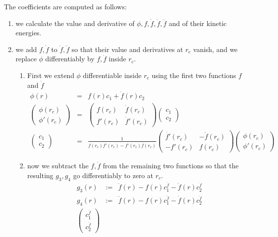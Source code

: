 \documentclass[11pt,a4paper]{report}
\begin{document}
The coefficients are computed as follows:
\begin{enumerate}
\item we calculate the value and derivative of
  $\phi,f,\dot{f},\ddot{f},\dddot{f}$ and of their kinetic energies.
\item we add $f,\dot{f}$ to $\ddot{f},\dddot{f}$ so that their value
  and derivatives at $r_c$ vanish, and we replace $\phi$
  differentiably by $f,\dot{f}$ inside $r_c$.
\begin{enumerate}
\item First we extend $\phi$ differentiable inside $r_c$ using the
  first two functions $f$ and $\dot{f}$
\begin{eqnarray}
\phi(r)&=&f(r)c_1 + \dot{f}(r)c_2
\\
\left(\begin{array}{c}\phi(r_c)\\\phi'(r_c)\end{array}\right)
&=&
\left(\begin{array}{cc}f(r_c)&\dot{f}(r_c)\\f'(r_c)&\dot{f}'(r_c)\end{array}\right)
\left(\begin{array}{c}c_1\\c_2\end{array}\right)
\nonumber\\
\left(\begin{array}{c}c_1\\c_2\end{array}\right)
&=&
\frac{1}{f(r_c)\dot{f'}(r_c)-f'(r_c)\dot{f}(r_c)}
\left(\begin{array}{cc}\dot{f'}(r_c)&-\dot{f}(r_c)\\-f'(r_c)&f(r_c)\end{array}\right)
\left(\begin{array}{c}\phi(r_c)\\\phi'(r_c)\end{array}\right)
\end{eqnarray}
%
\item now we subtract the $f,\dot{f}$ from the remaining two functions
  so that the resulting $g_3,g_4$ go differentiably to zero at $r_c$.
\begin{eqnarray}
g_3(r)&:=&\ddot{f}(r)-f(r) c_1^{\ddot{f}}-\dot{f}(r)c_2^{\ddot{f}}
\nonumber\\
g_4(r)&:=&\dddot{f}(r)-f(r) c_1^{\dddot{f}}-\dot{f}(r)c_2^{\dddot{f}}
\nonumber\\
\left(\begin{array}{c}c^{\ddot{f}}_1\\c^{\ddot{f}}_2\end{array}\right)

\end{eqnarray}
\end{enumerate}
\end{enumerate}
\end{document}
